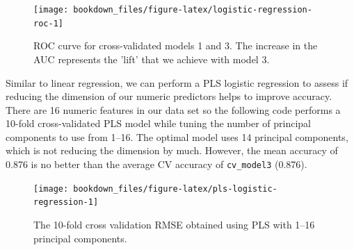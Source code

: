 \documentclass[]{krantz}
\makeatletter
\newenvironment{Shaded}{\begin{snugshade}}{\end{snugshade}}
\newcommand{\CommentTok}[1]{\textcolor[rgb]{0.37,0.37,0.37}{\textit{#1}}}
\newcommand{\DataTypeTok}[1]{\textcolor[rgb]{0.27,0.27,0.27}{#1}}
\newcommand{\DecValTok}[1]{\textcolor[rgb]{0.06,0.06,0.06}{#1}}
\newcommand{\KeywordTok}[1]{\textcolor[rgb]{0.27,0.27,0.27}{\textbf{#1}}}
\newcommand{\NormalTok}[1]{#1}
\newcommand{\OperatorTok}[1]{\textcolor[rgb]{0.43,0.43,0.43}{\textbf{#1}}}
\newcommand{\StringTok}[1]{\textcolor[rgb]{0.5,0.5,0.5}{#1}}
\newenvironment{kframe}{%
\medskip{}
\setlength{\fboxsep}{.8em}
 \def\at@end@of@kframe{}%
 \ifinner\ifhmode%
  \def\at@end@of@kframe{\end{minipage}}%
  \begin{minipage}{\columnwidth}%
 \fi\fi%
 \def\FrameCommand##1{\hskip\@totalleftmargin \hskip-\fboxsep
 \colorbox{shadecolor}{##1}\hskip-\fboxsep
     \hskip-\linewidth \hskip-\@totalleftmargin \hskip\columnwidth}%
 \MakeFramed {\advance\hsize-\width
   \@totalleftmargin\z@ \linewidth\hsize
   \@setminipage}}%
 {\par\unskip\endMakeFramed%
 \at@end@of@kframe}
\renewenvironment{Shaded}{\begin{kframe}}{\end{kframe}}
\makeatother
\begin{document}
\begin{figure}

{\centering \texttt{[image: bookdown\_files/figure-latex/logistic-regression-roc-1]} 

}

\caption{ROC curve for cross-validated models 1 and 3. The increase in the AUC represents the 'lift' that we achieve with model 3.}\label{fig:logistic-regression-roc}
\end{figure}

Similar to linear regression, we can perform a PLS logistic regression to assess if reducing the dimension of our numeric predictors helps to improve accuracy. There are 16 numeric features in our data set so the following code performs a 10-fold cross-validated PLS model while tuning the number of principal components to use from 1--16. The optimal model uses 14 principal components, which is not reducing the dimension by much. However, the mean accuracy of 0.876 is no better than the average CV accuracy of \texttt{cv\_model3} (0.876).

\begin{Shaded}
\end{Shaded}

\begin{figure}

{\centering \texttt{[image: bookdown\_files/figure-latex/pls-logistic-regression-1]} 

}

\caption{The 10-fold cross validation RMSE obtained using PLS with 1--16 principal components.}\label{fig:pls-logistic-regression}
\end{figure}
\end{document}
